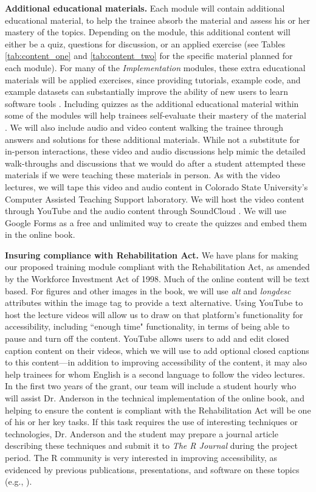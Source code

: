 \documentclass[pdftex,english,11.5pt,parskip=half]{scrartcl}
\begin{document}
\textbf{Additional educational materials.} Each module will contain additional
educational material, to help the trainee absorb the material and assess his or
her mastery of the topics. Depending on the module, this additional content will
either be a quiz, questions for discussion, or an applied exercise (see Tables
\ref*{tab:content_one} and \ref*{tab:content_two} for the specific material
planned for each module). For many of the \textit{Implementation} modules, these extra educational materials will be applied exercises, since providing tutorials, example code, and example datasets can substantially improve the ability of new users to learn software tools \cite{list2017ten, searls2012ten, via2011ten}. Including quizzes as the additional educational material within some of the modules will help trainees self-evaluate their mastery of the material \cite{searls2012ten, via2011ten}. 
We will also include audio and
video content walking the trainee through answers and solutions for these
additional materials. While not a substitute for in-person interactions, these video
and audio discussions help mimic the detailed
walk-throughs and discussions that we would do after a student attempted these
materials if we were teaching these materials in person. As with the video lectures, we will tape this video
and audio content in Colorado State University's Computer Assisted Teaching Support laboratory. We will host the video content through YouTube \cite{youtube} and the
audio content through SoundCloud \cite{soundcloud}. We will use Google Forms \cite{googleforms} as a free and unlimited way
to create the quizzes and embed them in the online book.

\noindent \textbf{Insuring compliance with Rehabilitation Act.} We have plans
for making our proposed training module compliant with the
Rehabilitation Act, as amended by the Workforce Investment
Act of 1998. Much of the online content will be text based. For figures and
other images in the book, we will use \textit{alt} and \textit{longdesc} attributes
within the image tag to provide a text alternative. Using YouTube to host the
lecture videos will allow us to draw on that platform's functionality for accessibility,
including ``enough time" functionality, in terms of being able to pause and turn
off the content. YouTube allows users to add and edit closed caption content on
their videos, which we will use to add optional closed captions to this
content---in addition to improving accessibility of the content, it may also
help trainees for whom English is a second language to follow the video lectures. In
the first two years of the grant, our team will include a student hourly who will assist
Dr. Anderson in the technical implementation of the online book, and helping to
ensure the content is compliant with the Rehabilitation Act will be one of his or her
key tasks. If this task requires the use of interesting techniques or
technologies, Dr. Anderson and the student may prepare a journal article
describing these techniques and submit it to \textit{The R Journal} during the
project period. The R community is very interested in improving
accessibility, as evidenced by previous publications, presentations, and
software on these topics (e.g., \cite{uswebr, godfrey2013statistical}).
\end{document}
